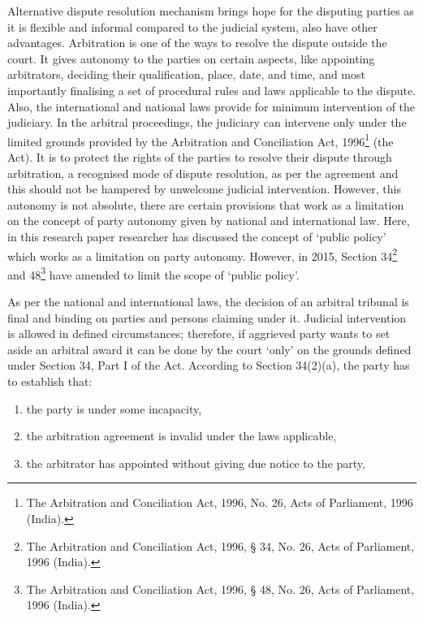 \begin{multicols}{2}
\noi
Alternative dispute resolution mechanism brings hope for the disputing parties as it is flexible
and informal compared to the judicial system, also have other advantages. Arbitration is one
of the ways to resolve the dispute outside the court. It gives autonomy to the parties on certain
aspects, like appointing arbitrators, deciding their qualification, place, date, and time, and most
importantly finalising a set of procedural rules and laws applicable to the dispute. Also, the
international and national laws provide for minimum intervention of the judiciary. In the
arbitral proceedings, the judiciary can intervene only under the limited grounds provided by
the Arbitration and Conciliation Act, 1996\footnote{The Arbitration and Conciliation Act, 1996, No. 26, Acts of Parliament, 1996 (India).}  (the Act). It is to protect the rights of the parties
to resolve their dispute through arbitration, a recognised mode of dispute resolution, as per the
agreement and this should not be hampered by unwelcome judicial intervention. However,
this autonomy is not absolute, there are certain provisions that work as a limitation on the
concept of party autonomy given by national and international law. Here, in this research paper
researcher has discussed the concept of ‘public policy’ which works as a limitation on party
autonomy. However, in 2015, Section 34\footnote{The Arbitration and Conciliation Act, 1996, § 34, No. 26, Acts of Parliament, 1996 (India).} and 48\footnote{The Arbitration and Conciliation Act, 1996, § 48, No. 26, Acts of Parliament, 1996 (India).} have amended to limit the scope of ‘public policy’.


\noi
As per the national and international laws, the decision of an arbitral tribunal is final and
binding on parties and persons claiming under it. Judicial intervention is allowed in defined
circumstances; therefore, if aggrieved party wants to set aside an arbitral award it can be done
by the court ‘only’ on the grounds defined under Section 34, Part I of the Act. According to
Section 34(2)(a), the party has to establish that:

\begin{enumerate}[label=$\alph*.$]
\item the party is under some incapacity,

\item the arbitration agreement is invalid under the laws applicable,

\item the arbitrator has appointed without giving due notice to the party,


\end{enumerate}
\end{multicols}
